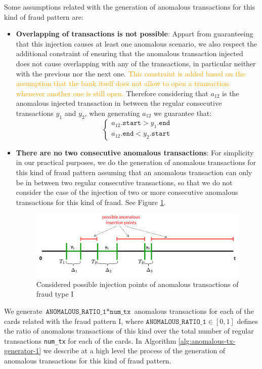 \documentclass{article}
\begin{document}
Some assumptions related with the generation of anomalous transactions for this kind of fraud pattern are:
\begin{itemize}
  \item \textbf{Overlapping of transactions is not possible}:
  Appart from guaranteeing that this injection causes at least one anomalous scenario, we also respect the additional constraint of ensuring that the anomalous transaction injected does not cause overlapping with any of the transactions, in particular neither with the previous nor the next one. \textcolor{orange}{This constraint is added based on the assumption that the bank itself does not allow to open a transaction whenever another one is still open.} Therefore considering that $a_{12}$ is the anomalous injected transaction in between the regular consecutive transactions $y_1$ and $y_2$, when generating $a_{12}$ we guarantee that:
  $$
  \begin{cases}
    a_{12}.\texttt{start} > y_{1}.\texttt{end} \\
    a_{12}.\texttt{end} < y_{2}.\texttt{start}
  \end{cases}
  $$
  \item \textbf{There are no two consecutive anomalous transactions}: For simplicity in our practical purposes, we do the generation of anomalous transactions for this kind of fraud pattern assuming that an anomalous transaction can only be in between two regular consecutive transactions, so that we do not consider the case of the injection of two or more consecutive anomalous transactions for this kind of fraud. See Figure \ref{img:anomalous-type-1-insertion-points}.
  \begin{figure}[H]
    \centering
    \includegraphics[width=\textwidth]{images/tx-generation-anomalous-1.png}
    \caption{Considered possible injection points of anomalous transactions of fraud type I}
    \label{img:anomalous-type-1-insertion-points}
  \end{figure}  
\end{itemize}

We generate $\texttt{ANOMALOUS\_RATIO\_1} * \texttt{num\_tx}$ anomalous transactions for each of the cards related with the fraud pattern I, where $\texttt{ANOMALOUS\_RATIO\_1} \in [0,1]$ defines the ratio of anomalous transactions of this kind over the total number of regular transactions \texttt{num\_tx} for each of the cards. In Algorithm \ref{alg:anomalous-tx-generator-1} we describe at a high level the process of the generation of anomalous transactions for this kind of fraud pattern. 
\end{document}
